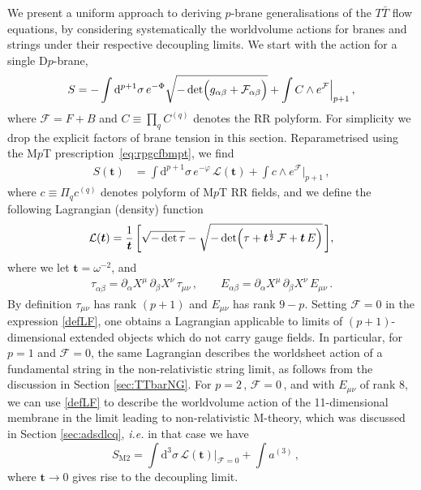 \documentclass[11pt]{article}
\newcommand{\be}{\begin{equation}}
\newcommand{\ee}{\end{equation}}
\newcommand{\CF}{\mathcal{F}}
\newcommand{\p}{\partial}
\renewcommand{\emph}[1]{\textit{#1}}
\newcommand{\dd}{\mathrm{d}}
\newcommand{\lambdap}{\boldsymbol{t}}
\begin{document}
We present a uniform approach to deriving $p$-brane generalisations of the $T\bar T$ flow equations, by considering systematically the worldvolume actions for branes and strings under their respective decoupling limits.
We start with the action for a single D$p$-brane,
%
\be
    S = - \int \dd^{p+1} \sigma \, e^{-\Phi} \sqrt{-\det \Bigl(g_{\alpha \beta} + \mathcal{F}_{\alpha \beta} \Bigr)} 
    + \int C \wedge e^{\CF} \Big|_{p+1}\,,
\ee
%
where $\mathcal{F} = F +B$ and $C \equiv \prod_q C^{(q)}$ denotes the RR polyform.
For simplicity we drop the explicit factors of brane tension in this section.
Reparametrised using the M$p$T prescription~\eqref{eq:rpgcfbmpt}, we find
%
\be
\begin{split} 
S(\lambdap) & = \int \dd^{p+1} \sigma \, e^{-\varphi} \, \mathcal{L} (\lambdap) 
+ \int c \wedge e^{\mathcal{F}} \Big|_{p+1}\,,
\end{split} 
\label{DpForTTbar}
\ee
%
where $c \equiv \Pi_q c^{(q)}$ denotes polyform of M$p$T RR fields, and we define the following Lagrangian (density) function
%
\be
    \mathcal{L} (\lambdap) = \frac{1}{\lambdap} \, \biggl[
    \sqrt{-\det \tau} - 
    \sqrt{-\det \Bigl( \tau + \lambdap^{\frac{1}{2}} \, \mathcal{F} + \lambdap \,  E \Bigr)}\, \biggr],
\label{defLF}
\ee
%
where we let $\lambdap = \omega^{-2}$, and 
%
\begin{align}
    \tau^{}_{\alpha\beta} = \p^{}_\alpha X^\mu \, \p^{}_\beta X^\nu \, \tau^{}_{\mu\nu}\,, %
    \qquad E^{}_{\alpha\beta} = \p^{}_\alpha X^\mu \, \p^{}_\beta X^\nu \, E^{}_{\mu\nu}\,.
\end{align}
By definition $\tau_{\mu\nu}$ has rank $(p+1)$ and $E_{\mu\nu}$ has rank $9-p$. 
%
Setting $\mathcal{F} = 0$ in the expression \eqref{defLF}, one obtains a Lagrangian applicable to limits of $(p+1)$-dimensional extended objects which do not carry gauge fields.
In particular, for $p=1$ and $\mathcal{F}=0$, the same Lagrangian describes the worldsheet action of a fundamental string in the non-relativistic string limit, as follows from the discussion in Section \ref{sec:TTbarNG}.
For $p=2$\,, $\mathcal{F}=0$\,, and with $E_{\mu\nu}$ of rank 8, we can use \eqref{defLF} to describe the worldvolume action of the 11-dimensional membrane in the limit leading to non-relativistic M-theory, which was discussed in Section \ref{sec:adsdlcq}, \emph{i.e.} in that case we have
%
\be
S_{\text{M2}} = \int \dd^{3} \sigma \, \mathcal{L}(\lambdap)\Big|_{\mathcal{F}=0} + \int a^{(3)} \,,\quad
\ee
%
where $\lambdap \rightarrow 0$ gives rise to the decoupling limit.
\end{document}
